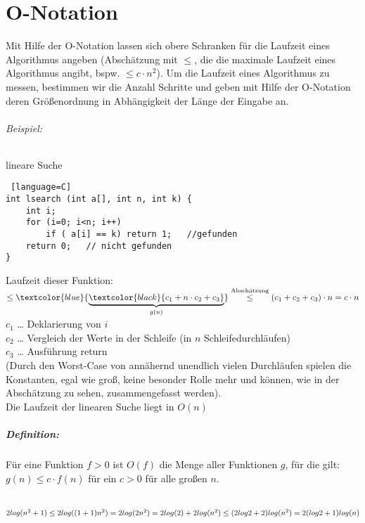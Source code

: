 \documentclass{scrreprt}
\begin{document}
\chapter{O-Notation}
Mit Hilfe der O-Notation lassen sich obere Schranken für die Laufzeit eines Algorithmus angeben (Abschätzung mit $\leq$, die die maximale Laufzeit eines Algorithmus angibt, bspw. $\leq c \cdot n^2$). Um die Laufzeit eines Algorithmus zu messen, bestimmen wir die Anzahl Schritte und geben mit Hilfe der O-Notation deren Größenordnung in Abhängigkeit der Länge der Eingabe an.

\subparagraph{Beispiel:} lineare Suche
\begin{lstlisting} [language=C]
int lsearch (int a[], int n, int k) {
	int i;
	for (i=0; i<n; i++)
		if ( a[i] == k) return 1;	//gefunden
	return 0;	// nicht gefunden
}
\end{lstlisting}
Laufzeit dieser Funktion:\\
$\leq \textcolor{blue}{\underbrace{\textcolor{black}{c_1+ n\cdot c_2+c_3}}_{g(n)}} \overset{\text{Abschätzung}}{\leq}(c_1+c_2+c_3)\cdot n= c \cdot n$\\
$c_1$ … Deklarierung von $i$\\
$c_2$ … Vergleich der Werte in der Schleife (in $n$ Schleifedurchläufen)\\
$c_3$ … Ausführung return\\
(Durch den Worst-Case von annähernd unendlich vielen Durchläufen spielen die Konstanten, egal wie groß, keine besonder Rolle mehr und können, wie in der Abschätzung zu sehen, zusammengefasst werden).\\
Die Laufzeit der linearen Suche liegt in $O(n)$

\paragraph{Definition:} Für eine Funktion $f>0$ ist $O(f)$ die Menge aller Funktionen $g$, für die gilt:\\
$g(n)\leq c\cdot f(n)$ für ein $c>0$ für alle großen $n$.\\
\\
$
2 log (n^2+1)\\
\leq 2 log ((1+1)n^2)\\
=2 log (2n^2)\\
= 2 log (2) + 2 log( n^2)\\
\leq (2log2+2)log(n^2)\\
= 2 (log2+1)log(n)
$
\end{document}

